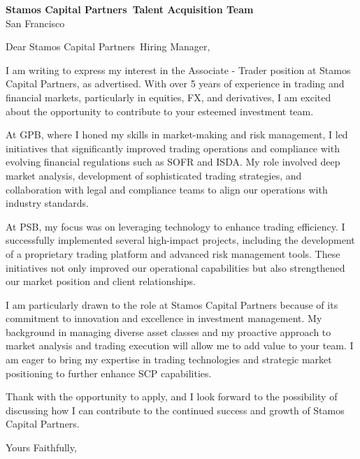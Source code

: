 \documentclass{letter}
\newcommand{\company}{Stamos Capital Partners}
\begin{document}
\begin{letter}{\textbf{\company\ Talent Acquisition Team} \\                
    San Francisco }

\opening{Dear \company\ Hiring Manager,}

I am writing to express my interest in the Associate - Trader position at Stamos Capital Partners, as advertised. With over 5 years of experience in trading and financial markets, particularly in equities, FX, and derivatives, I am excited about the opportunity to contribute to your esteemed investment team.

At GPB, where I honed my skills in market-making and risk management, I led initiatives that significantly improved trading operations and compliance with evolving financial regulations such as SOFR and ISDA. My role involved deep market analysis, development of sophisticated trading strategies, and collaboration with legal and compliance teams to align our operations with industry standards.

At PSB, my focus was on leveraging technology to enhance trading efficiency. I successfully implemented several high-impact projects, including the development of a proprietary trading platform and advanced risk management tools. These initiatives not only improved our operational capabilities but also strengthened our market position and client relationships.

I am particularly drawn to the role at Stamos Capital Partners because of its commitment to innovation and excellence in investment management. My background in managing diverse asset classes and my proactive approach to market analysis and trading execution will allow me to add value to your team. I am eager to bring my expertise in trading technologies and strategic market positioning to further enhance SCP capabilities.

Thank with the opportunity to apply, and I look forward to the possibility of discussing how I can contribute to the continued success and growth of Stamos Capital Partners.



\closing{Yours Faithfully,}

\end{letter}
\end{document}
